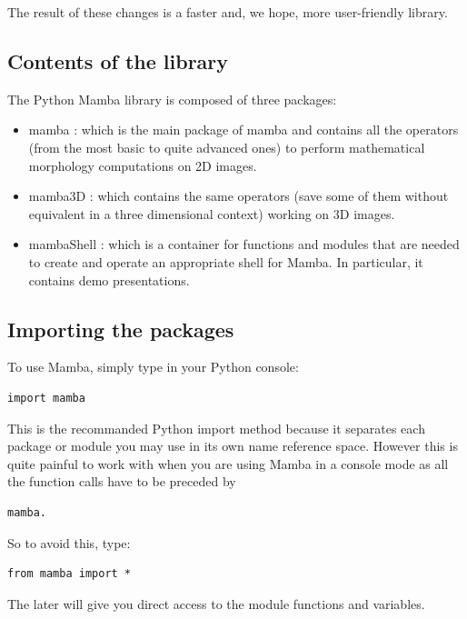 \documentclass[a4paper,10pt,oneside]{article}
\begin{document}
The result of these changes is a faster and, we hope, more user-friendly
library.

\subsection{Contents of the library}

The Python Mamba library is composed of three packages:
\begin{itemize}
\item mamba : which is the main package of mamba and contains all the operators
(from the most basic to quite advanced ones) to perform mathematical morphology
computations on 2D images.
\item mamba3D : which contains the same operators (save some of them without
equivalent in a three dimensional context) working on 3D images.
\item mambaShell : which is a container for functions and modules that are
needed to create and operate an appropriate shell for Mamba. In particular, it
contains demo presentations.
\end{itemize}

\subsection{Importing the packages}

To use Mamba, simply type in your Python console:

\lstset{language=Python}
\begin{lstlisting}
import mamba
\end{lstlisting}

This is the recommanded Python import method because it separates each package
or module you may use in its own name reference space. However this is quite painful
to work with when you are using Mamba in a console mode as all the function 
calls have to be preceded by

\lstset{language=Python}
\begin{lstlisting}
mamba.
\end{lstlisting}

So to avoid this, type:

\lstset{language=Python}
\begin{lstlisting}
from mamba import *
\end{lstlisting}

The later will give you direct access to the module functions and variables.
\end{document}
